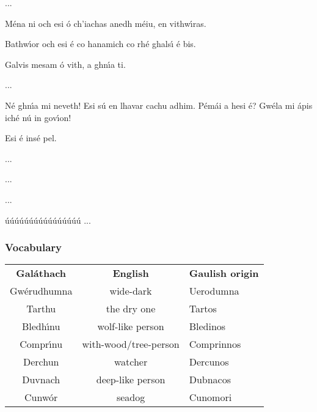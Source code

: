 \begin{leftbubbles}...\end{leftbubbles}
\begin{rightbubbles}M\'{e}na ni och esi \'{o} ch’iachas anedh m\'{e}iu, en vithw\'{\i}ras.\end{rightbubbles}
\begin{rightbubbles}Bathw\'{\i}or och esi \'{e} co hanamich co rh\'{e} ghals\'{\i} \'{e} bis.\end{rightbubbles}
\begin{rightbubbles}Galvis mesam \'{o} vith, a ghn\'{\i}a ti.\end{rightbubbles}
\begin{rightbubbles}...\end{rightbubbles}
\begin{leftbubbles}N\'{e} ghn\'{\i}a mi neveth! Esi s\'{u} en lhavar cachu adhim. P\'{e}m\'{a}i a hesi \'{e}? Gw\'{e}la mi \'{a}pis ich\'{e} n\'{u} in gov\'{\i}on!\end{leftbubbles}
\begin{rightbubbles}Esi \'{e} ins\'{e} pel.\end{rightbubbles}
\begin{rightbubbles}...\end{rightbubbles}
\begin{rightbubbles}...\end{rightbubbles}
\begin{rightbubbles}...\end{rightbubbles}
\begin{rightbubbles}\'{u}\'{u}\'{u}\'{u}\'{u}\'{u}\'{u}\'{u}\'{u}\'{u}\'{u}\'{u}\'{u}\'{u}\'{u}\'{u} ...\end{rightbubbles}
\endgroup

\newpage
\subsubsection{Vocabulary}

\begin{table}[H]
\centering
\begin{tabular}{cc}
  \toprule
  \textbf{Gal\'{a}thach} & \textbf{English} & \textbf{Gaulish origin}\\
  \cmidrule(lr){1-1}\cmidrule(lr){2-2}\cmidrule(lr){3-3}
  Gw\'{e}rudhumna & wide-dark & Uerodumna\\
  Tarthu & the dry one & Tartos\\
  Bledh\'{\i}nu & wolf-like person & Bledinos\\
  Compr\'{\i}nu & with-wood/tree-person & Comprinnos\\
  Derchun & watcher & Dercunos\\
  Duvnach & deep-like person & Dubnacos\\
  Cunw\'{o}r & seadog & Cunomori\\
  \bottomrule
\end{tabular}
\label{vocab_conversation_spatial_system}
\end{table}

